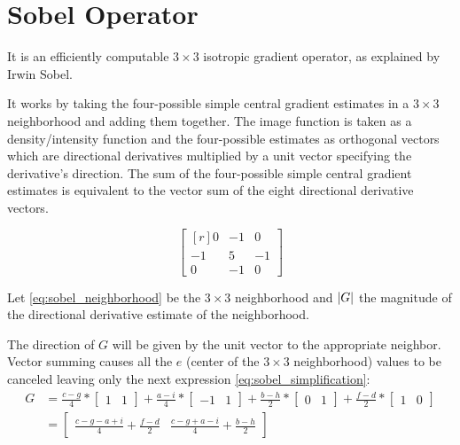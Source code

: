 \documentclass{cslthse-msc}
\DeclarePairedDelimiter\abs{\lvert}{\rvert}%
\begin{document}
\section{Sobel Operator}
It is an efficiently computable $3\times 3$ isotropic gradient operator, as explained by Irwin Sobel. \cite{Sobel2014}

It works by taking the four-possible simple central gradient estimates in a $3\times 3$ neighborhood and adding them together. The image function is taken as a density/intensity function and the four-possible estimates as orthogonal vectors which are directional derivatives multiplied by a unit vector specifying the derivative’s direction.  The sum of the four-possible simple central gradient estimates is equivalent to the vector sum of the eight directional derivative vectors.

\begin{equation}
\begin{bmatrix*}[r]\label{eq:sobel_neighborhood}
0 & -1 &  0 \\
-1 &  5 & -1 \\
0 & -1 &  0
\end{bmatrix*}
\end{equation}

Let \ref{eq:sobel_neighborhood} be the $3\times 3$ neighborhood and $\abs*{G}$ the magnitude of the directional derivative estimate of the neighborhood.  

The direction of $G$ will be given by the unit vector to the appropriate neighbor. Vector summing causes all the $e$ (center of the $3\times 3$ neighborhood) values to be canceled leaving only the next expression \ref{eq:sobel_simplification}:
\begin{equation}\label{eq:sobel_simplification}
\begin{split}
	G & =\frac{c-g}{4}*\begin{bmatrix*}1 & 1\end{bmatrix*}+\frac{a-i}{4}*\begin{bmatrix*}-1 & 1\end{bmatrix*}+\frac{b-h}{2}*\begin{bmatrix*}0 & 1\end{bmatrix*}+\frac{f-d}{2}*\begin{bmatrix*}1 & 0\end{bmatrix*} \\ & =\begin{bmatrix*}\frac{c-g-a+i}{4}+\frac{f-d}{2} & \frac{c-g+a-i}{4}+\frac{b-h}{2}\end{bmatrix*}
\end{split}
\end{equation}
\end{document}

